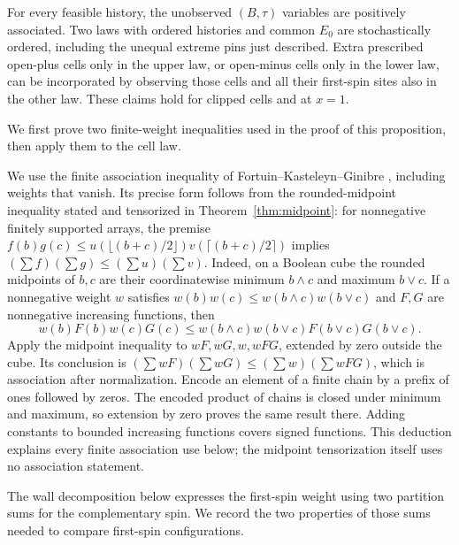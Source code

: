 \begin{proposition}\label{prop:history-order}
For every feasible history, the unobserved $(B,\tau)$ variables are
positively associated. Two laws with ordered histories and common $E_0$
are stochastically ordered, including the unequal extreme pins just
described. Extra prescribed open-plus cells only in the upper law, or
open-minus cells only in the lower law, can be incorporated by observing
those cells and all their first-spin sites also in the other law. These
claims hold for clipped cells and at $x=1$.
\end{proposition}

We first prove two finite-weight inequalities used in the proof of this
proposition, then apply them to the cell law.

We use the finite association inequality of Fortuin--Kasteleyn--Ginibre
\cite{FKG1971}, including weights that vanish.  Its precise form follows
from the rounded-midpoint inequality stated and tensorized in
Theorem~\ref{thm:midpoint}: for nonnegative finitely supported arrays,
the premise
$f(b)g(c)\le u(\lfloor(b+c)/2\rfloor)v(\lceil(b+c)/2\rceil)$
implies $(\sum f)(\sum g)\le(\sum u)(\sum v)$.
Indeed, on a Boolean cube the rounded
midpoints of $b,c$ are their coordinatewise minimum $b\wedge c$ and
maximum $b\vee c$.  If a nonnegative weight $w$ satisfies
$w(b)w(c)\le w(b\wedge c)w(b\vee c)$ and $F,G$ are nonnegative
increasing functions, then
\[
 w(b)F(b)w(c)G(c)
 \le w(b\wedge c)w(b\vee c)F(b\vee c)G(b\vee c).
\]
Apply the midpoint inequality to $wF,wG,w,wFG$, extended by zero
outside the cube.  Its conclusion is
$(\sum wF)(\sum wG)\le(\sum w)(\sum wFG)$, which is association
after normalization.  Encode an element of a finite chain by a prefix
of ones followed by zeros.  The encoded product of chains is closed
under minimum and maximum, so extension by zero proves the same result
there.  Adding constants to bounded increasing functions covers signed
functions.  This deduction explains every finite association use below;
the midpoint tensorization itself uses no association statement.

The wall decomposition below expresses the first-spin weight using two
partition sums for the complementary spin.  We record the two properties
of those sums needed to compare first-spin configurations.

